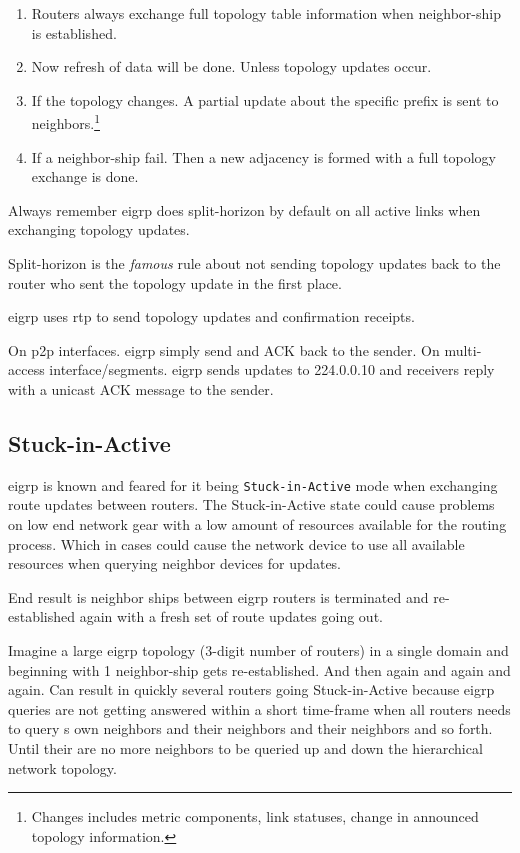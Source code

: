\begin{enumerate}
    \item Routers always exchange full topology table information when neighbor-ship is established.
    \item Now refresh of data will be done. Unless topology updates occur.
    \item If the topology changes. A partial update about the specific prefix is sent to neighbors.\footnote{Changes includes metric components, link statuses, change in announced topology information.}
    \item If a neighbor-ship fail. Then a new adjacency is formed with a full topology exchange is done.
\end{enumerate}

Always remember \gls{eigrp} does split-horizon by default on all active links when exchanging topology updates.

Split-horizon is the \textit{famous} rule about not sending topology updates back to the router who sent the topology update in the first place.

\gls{eigrp} uses \gls{rtp} to send topology updates and confirmation receipts.

On \gls{p2p} interfaces. \gls{eigrp} simply send and ACK back to the sender.
On multi-access interface/segments. \gls{eigrp} sends updates to 224.0.0.10 and receivers reply with a unicast ACK message to the sender.

\subsection[SIA]{Stuck-in-Active}
\gls{eigrp} is known and feared for it being \texttt{Stuck-in-Active} mode when exchanging route updates between routers. The Stuck-in-Active state could cause problems on low end network gear with a low amount of resources available for the routing process. Which in cases could cause the network device to use all available resources when querying neighbor devices for updates.


End result is neighbor ships between \gls{eigrp} routers is terminated and re-established again with a fresh set of route updates going out.

Imagine a large \gls{eigrp} topology (3-digit number of routers) in a single domain and beginning with 1 neighbor-ship gets re-established. And then again and again and again. Can result in quickly several routers going Stuck-in-Active because \gls{eigrp} queries are not getting answered within a short time-frame when all routers needs to query s own neighbors and their neighbors and their neighbors and so forth. Until their are no more neighbors to be queried up and down the hierarchical network topology.

